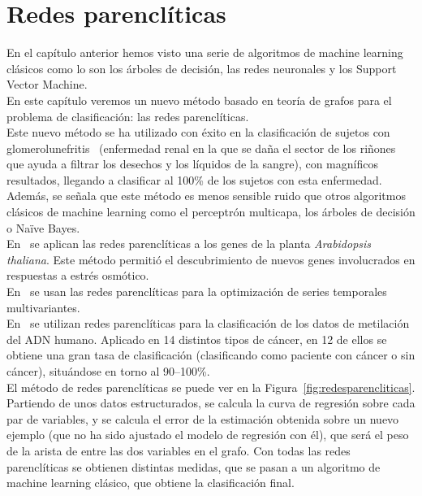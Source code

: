 \chapter{Redes parenclíticas}

En el capítulo anterior hemos visto una serie de algoritmos de machine learning clásicos como lo son los árboles de decisión, las redes neuronales y los Support Vector Machine.\\

En este capítulo veremos un nuevo método basado en teoría de grafos para el problema de clasificación: las redes parenclíticas.\\

Este nuevo método se ha utilizado con éxito en la clasificación de sujetos con glomerolunefritis~\cite{metabo3010155, 1304.1896} (enfermedad renal en la que se daña el sector de los riñones que ayuda a filtrar los desechos y los líquidos de la sangre), con magníficos resultados, llegando a clasificar al 100\% de los sujetos con esta enfermedad. Además, se señala que este método es menos sensible ruido que otros algoritmos clásicos de machine learning como el perceptrón multicapa, los árboles de decisión o Naïve Bayes.\\

En~\cite{Zanin2014} se aplican las redes parenclíticas a los genes de la planta \textit{Arabidopsis thaliana}. Este método permitió el descubrimiento de nuevos genes involucrados en respuestas a estrés osmótico.\\

En~\cite{Zanin2012} se usan las redes parenclíticas para la optimización de series temporales multivariantes.\\

En~\cite{1506.04421} se utilizan redes parenclíticas para la clasificación de los datos de metilación del ADN humano. Aplicado en 14 distintos tipos de cáncer, en 12 de ellos se obtiene una gran tasa de clasificación (clasificando como paciente con cáncer o sin cáncer), situándose en torno al 90--100\%.\\

El método de redes parenclíticas se puede ver en la Figura~\ref{fig:redesparencliticas}. Partiendo de unos datos estructurados, se calcula la curva de regresión sobre cada par de variables, y se calcula el error de la estimación obtenida sobre un nuevo ejemplo (que no ha sido ajustado el modelo de regresión con él), que será el peso de la arista de entre las dos variables en el grafo. Con todas las redes parenclíticas se obtienen distintas medidas, que se pasan a un algoritmo de machine learning clásico, que obtiene la clasificación final.     

